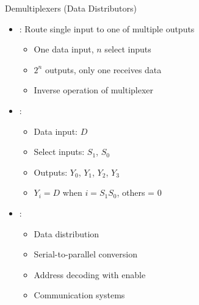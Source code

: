 \begin{frame}{Demultiplexers (Data Distributors)}
\begin{itemize}
\item {}: Route single input to one of multiple outputs
\begin{itemize}
\item One data input, $n$ select inputs
\item $2^n$ outputs, only one receives data
\item Inverse operation of multiplexer
\end{itemize}
\vspace{0.5cm}
\item {}:
\begin{itemize}
\item Data input: $D$
\item Select inputs: $S_1$, $S_0$
\item Outputs: $Y_0$, $Y_1$, $Y_2$, $Y_3$
\item $Y_i = D$ when $i = S_1S_0$, others = 0
\end{itemize}
\vspace{0.3cm}
\item {}:
\begin{itemize}
\item Data distribution
\item Serial-to-parallel conversion
\item Address decoding with enable
\item Communication systems
\end{itemize}
\end{itemize}
\end{frame}

